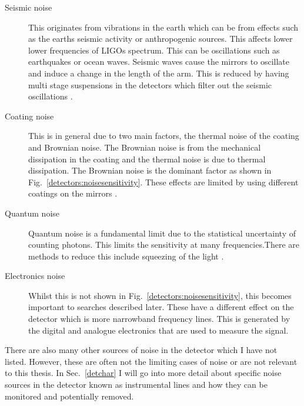 \begin{description}
\item[Seismic noise] This originates from vibrations in the earth which can be from effects such as the earths seismic activity or anthropogenic sources. This affects lower lower frequencies of \glspl{LIGO} spectrum. This can be oscillations such as earthquakes or ocean waves. Seismic waves cause the mirrors to oscillate and induce a change in the length of the arm. This is reduced by having multi stage suspensions in the detectors which filter out the seismic oscillations \citep{matichard2015SeismicIsolation}.

\item[Coating noise] This is in general due to two main factors, the thermal noise of the coating and Brownian noise. The Brownian noise is from the mechanical dissipation in the coating and the thermal noise is due to thermal dissipation. The Brownian noise is the dominant factor as shown in Fig.~\ref{detectors:noisesensitivity}. These effects are limited by using different coatings on the mirrors \citep{abernathy0OverviewResearch}.

\item[Quantum noise] Quantum noise is a fundamental limit due to the statistical uncertainty of counting photons. This limits the sensitivity at many frequencies.There are methods to reduce this include squeezing of the light \citep{aasi2013EnhancedSensitivity}. 

\item[Electronics noise ] Whilst this is not shown in Fig.~\ref{detectors:noisesensitivity}, this becomes important to searches described later. These have a different effect on the detector which is more narrowband frequency lines. This is generated by the digital and analogue electronics that are used to measure the signal. 
\end{description}

There are also many other sources of noise in the detector which I have not listed. However, these are often not the limiting cases of noise or are not relevant to this thesis.
In Sec.~\ref{detchar} I will go into more detail about specific noise sources in the detector known as instrumental lines and how they can be monitored and potentially removed. 












